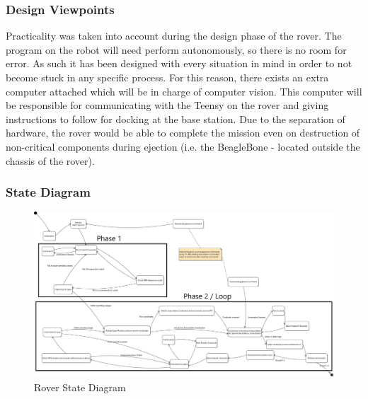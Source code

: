 \documentclass[onecolumn, draftclsnofoot, 10pt, compsoc]{IEEEtran}
\begin{document}
\subsubsection{Design Viewpoints}
Practicality was taken into account during the design phase of the rover. The program on the robot will need perform autonomously, so there is no room for error. As such it has been designed with every situation in mind in order to not  become stuck in any specific process. For this reason, there exists an extra computer attached which will be in charge of computer vision. This computer will be responsible for communicating with the Teensy on the rover and giving instructions to follow for docking at the base station. Due to the separation of hardware, the rover would be able to complete the mission even on destruction of non-critical components during ejection (i.e. the BeagleBone - located outside the chassis of the rover). 

\newpage
\begin{landscape}
\subsubsection{State Diagram}
\vspace{1cm}
\begin{figure}[ht]
    \centering
    \includegraphics[width = 1.3 \textwidth,angle=0]{Figures/TeensyStateDiag.jpg}
    \caption{Rover State Diagram}
    \label{fig:my_label}
\end{figure}
\end{landscape}
\end{document}
